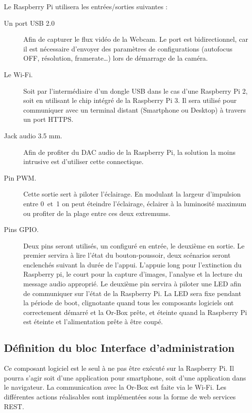 Le Raspberry Pi utilisera les entrées/sorties suivantes :
\begin{description}
    \item [Un port USB 2.0] Afin de capturer le flux vidéo de la Webcam.
    Le port est bidirectionnel, car il est nécessaire d'envoyer des paramètres de configurations (autofocus OFF, résolution, framerate\ldots) lors de démarrage de la caméra.
    \item [Le Wi-Fi.] Soit par l'intermédiaire d'un dongle USB dans le cas d'une Raspberry Pi 2, soit en utilisant le chip intégré de la Raspberry Pi 3.
    Il sera utilisé pour communiquer avec un terminal distant (Smartphone ou Desktop) à travers un port HTTPS.
    \item [Jack audio 3.5 mm.] Afin de profiter du DAC audio de la Raspberry Pi, la solution la moins intrusive est d'utiliser cette connectique.
    \item [Pin PWM.] Cette sortie sert à piloter l'éclairage.
    En modulant la largeur d'impulsion entre 0~et~1 on peut éteindre l'éclairage, éclairer à la luminosité maximum ou profiter de la plage entre ces deux extremums.
    \item [Pins GPIO.] Deux pins seront utilisés, un configuré en entrée, le deuxième en sortie.
    Le premier servira à lire l'état du bouton-poussoir, deux scénarios seront enclenchés suivant la durée de l'appui.
    L'appuie long pour l'extinction du Raspberry pi, le court pour la capture d'images, l'analyse et la lecture du message audio approprié.
    Le deuxième pin servira à piloter une LED afin de communiquer sur l'état de la Raspberry Pi.
    La LED sera fixe pendant la période de boot, clignotante quand tous les composants logiciels ont correctement démarré et la Or-Box prête, et éteinte quand la Raspberry Pi est éteinte et l'alimentation prête à être coupé.
\end{description}

\subsection{Définition du bloc Interface d'administration}
\label{sub:DefAdmin}

Ce composant logiciel est le seul à ne pas être exécuté sur la Raspberry Pi.
Il pourra s'agir soit d'une application pour smartphone, soit d'une application dans le navigateur.
La communication avec la Or-Box est faite via le Wi-Fi.
Les différentes actions réalisables sont implémentées sous la forme de web services REST.

